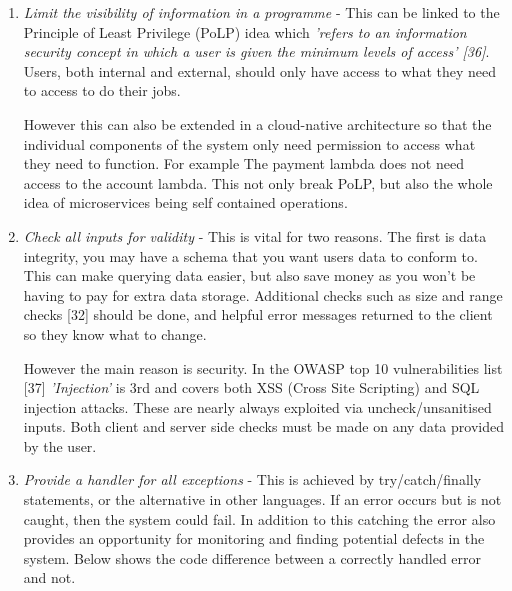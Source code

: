   \begin{enumerate}
    \item \textit{Limit the visibility of information in a programme} - This can be linked to the Principle of Least Privilege (PoLP) idea which 
    \textit{'refers to an information security concept in which a user is given the minimum levels of access' [36]}. Users, both internal and external, 
    should only have access to what they need to access to do their jobs. 

    However this can also be extended in a cloud-native architecture so that the individual components of the system only need permission to access what 
    they need to function. For example The payment lambda does not need access to the account lambda. This not only break PoLP, but also the whole idea of
    microservices being self contained operations.

    \item \textit{Check all inputs for validity} - This is vital for two reasons. The first is data integrity, you may have a schema that you want users
    data to conform to. This can make querying data easier, but also save money as you won't be having to pay for extra data storage. Additional checks such 
    as size and range checks [32] should be done, and helpful error messages returned to the client so they know what to change.
    
    However the main reason is security. In the OWASP top 10 vulnerabilities list [37] \textit{'Injection'} is 3rd and covers both XSS (Cross Site Scripting) 
    and SQL injection attacks. These are nearly always exploited via uncheck/unsanitised inputs. Both client and server side checks must be made on any data
    provided by the user. 

    \item \textit{Provide a handler for all exceptions} - This is achieved by try/catch/finally statements, or the alternative in other languages. If an 
    error occurs but is not caught, then the system could fail. In addition to this catching the error also provides an opportunity for monitoring and 
    finding potential defects in the system. Below shows the code difference between a correctly handled error and not.


\end{enumerate}
